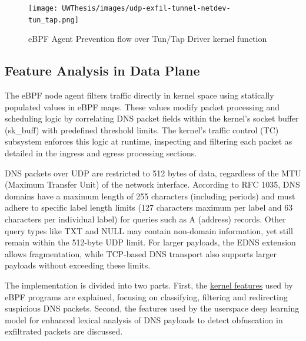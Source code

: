 \documentclass [11pt, proquest] {uwthesis}[2020/02/24]
\begin{document}
\begin{figure}[H]
\texttt{[image: UWThesis/images/udp-exfil-tunnel-netdev-tun\_tap.png]}
\caption{eBPF Agent Prevention flow over Tun/Tap Driver kernel function}
\label{sec:data_plane_tunnel_netdev}
\end{figure}



\subsection{Feature Analysis in Data Plane}
\label{sec:features}
The eBPF node agent filters traffic directly in kernel space using statically populated values in eBPF maps. These values modify packet processing and scheduling logic by correlating DNS packet fields within the kernel’s socket buffer (sk\_buff) with predefined threshold limits. The kernel’s traffic control (TC) subsystem enforces this logic at runtime, inspecting and filtering each packet as detailed in the ingress and egress processing sections.

DNS packets over UDP are restricted to 512 bytes of data, regardless of the MTU (Maximum Transfer Unit) of the network interface. According to RFC 1035, DNS domains have a maximum length of 255 characters (including periods) and must adhere to specific label length limits (127 characters maximum per label and 63 characters per individual label) for queries such as A (address) records. Other query types like TXT and NULL may contain non-domain information, yet still remain within the 512-byte UDP limit. For larger payloads, the EDNS extension allows fragmentation, while TCP-based DNS transport also supports larger payloads without exceeding these limits.

The implementation is divided into two parts. First, the  \hyperref[sec:kernel-features]{kernel features} used by eBPF programs are explained, focusing on classifying, filtering and redirecting suspicious DNS packets. Second, the features used by the userspace deep learning model for enhanced lexical analysis of DNS payloads to detect obfuscation in exfiltrated packets are discussed.
\end{document}
